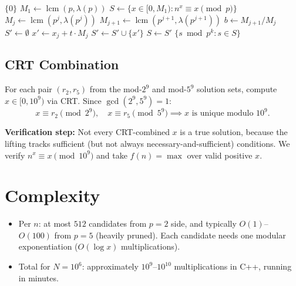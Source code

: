 \documentclass[11pt]{article}
\begin{document}
\begin{algorithm}[H]
\caption{Solve $n^x \equiv x \pmod{p^k}$}
\begin{algorithmic}[1]
     \Return $\{0\}$  \EndIf
    \State $M_1 \gets \operatorname{lcm}(p, \lambda(p))$
    \State $S \gets \{x \in [0, M_1) : n^x \equiv x \pmod{p}\}$
        \State $M_j \gets \operatorname{lcm}(p^j, \lambda(p^j))$
        \State $M_{j+1} \gets \operatorname{lcm}(p^{j+1}, \lambda(p^{j+1}))$
        \State $b \gets M_{j+1} / M_j$ 
        \State $S' \gets \emptyset$
                \State $x' \gets x_j + t \cdot M_j$
                    $S' \gets S' \cup \{x'\}$
                \EndIf
            \EndFor
        \EndFor
        \State $S \gets S'$
    \EndFor
    \State \Return $\{s \bmod p^k : s \in S\}$
\EndFunction
\end{algorithmic}
\end{algorithm}

\subsection{CRT Combination}

For each pair $(r_2, r_5)$ from the mod-$2^9$ and mod-$5^9$ solution sets,
compute $x \in [0, 10^9)$ via CRT. Since $\gcd(2^9, 5^9) = 1$:
\[
x \equiv r_2 \pmod{2^9}, \quad x \equiv r_5 \pmod{5^9}
\implies x \text{ is unique modulo } 10^9.
\]

\textbf{Verification step:} Not every CRT-combined $x$ is a true solution,
because the lifting tracks sufficient (but not always necessary-and-sufficient)
conditions. We verify $n^x \equiv x \pmod{10^9}$ and take $f(n) = \max$
over valid positive $x$.

\section{Complexity}

\begin{itemize}
    \item Per $n$: at most $512$ candidates from $p=2$ side, and typically
    $O(1)$--$O(100)$ from $p=5$ (heavily pruned). Each candidate needs
    one modular exponentiation ($O(\log x)$ multiplications).
    \item Total for $N = 10^6$: approximately $10^9$--$10^{10}$ multiplications
    in C++, running in minutes.
\end{itemize}
\end{document}
